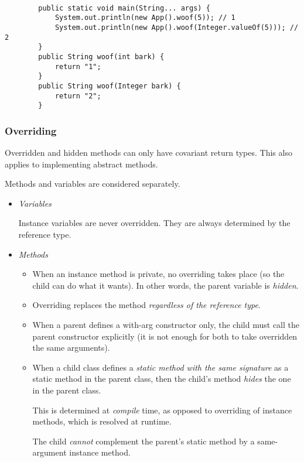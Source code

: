 \documentclass{scrartcl}
\begin{document}
    \begin{lstlisting}

        public static void main(String... args) {
            System.out.println(new App().woof(5)); // 1
            System.out.println(new App().woof(Integer.valueOf(5))); // 2
        }
        public String woof(int bark) {
            return "1";
        }
        public String woof(Integer bark) {
            return "2";
        }
    \end{lstlisting}

\subsubsection{Overriding}

    Overridden and hidden methods can only have covariant return types.
    This also applies to implementing abstract methods.

    Methods and variables are considered separately.

    \begin{itemize}
        \item \textit{Variables}

        Instance variables are never overridden. They are always determined by the reference type.

        \item \textit{Methods}

        \begin{itemize}
            \item
            When an instance method is private, no overriding takes place (so the child can do what it wants). In other words, the parent variable is \textit{hidden}.

             \item
            Overriding replaces the method \textit{regardless of the reference type}.

             \item
            When a parent defines a with-arg constructor only, the child must call the parent constructor
            explicitly (it is not enough for both to take overridden the same arguments).

            \item
            When a child class defines a \textit{static method with the same signature} as a static method in the parent class, then the child’s method \textit{hides} the one in the parent class.

            This is determined at \textit{compile} time, as opposed to overriding of instance methods, which is resolved at runtime.

            The child \textit{cannot} complement the parent's static method
            by a same-argument instance method.
        \end{itemize}



    \end{itemize}
\end{document}
